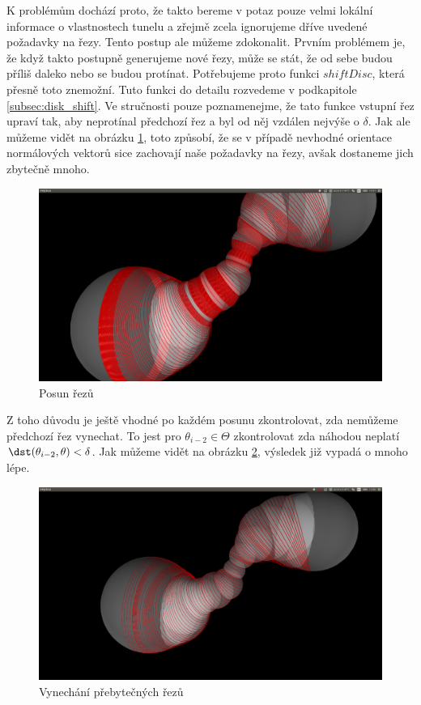 K problémům dochází proto, že takto bereme v potaz pouze velmi lokální informace o vlastnostech
tunelu a zřejmě zcela ignorujeme dříve uvedené požadavky na řezy. Tento postup ale
můžeme zdokonalit. Prvním problémem je, že když takto postupně generujeme nové řezy,
může se stát, že od sebe budou příliš daleko nebo se budou protínat. Potřebujeme proto
funkci $ shiftDisc $, která přesně toto znemožní. Tuto funkci do detailu rozvedeme v
podkapitole \ref{subsec:disk_shift}. Ve stručnosti pouze poznamenejme, že tato funkce
vstupní řez upraví tak, aby neprotínal předchozí řez a byl od něj vzdálen nejvýše
o $ \delta $. Jak ale můžeme vidět na obrázku \ref{fig:shift_cuts}, toto způsobí,
že se v případě nevhodné orientace normálových vektorů sice zachovají naše
požadavky na řezy, avšak dostaneme jich zbytečně mnoho.

\begin{figure}
    \centering
    \includegraphics[width=\textwidth]{img/shift_cuts.png}
    \caption{Posun řezů}
  \centering
  \label{fig:shift_cuts}
\end{figure}

Z toho důvodu je ještě vhodné po každém posunu zkontrolovat, zda nemůžeme předchozí
řez vynechat. To jest pro $ \theta_{i - 2} \in \Theta $ zkontrolovat zda
náhodou neplatí $ \dst(\theta_{i - 2}, \theta) < \delta $. Jak můžeme vidět na
obrázku \ref{fig:cuts_with_replace}, výsledek již vypadá o mnoho lépe.

\begin{figure}
    \centering
    \includegraphics[width=\textwidth]{img/cuts_with_replace.png}
    \caption{Vynechání přebytečných řezů}
  \centering
  \label{fig:cuts_with_replace}
\end{figure}

